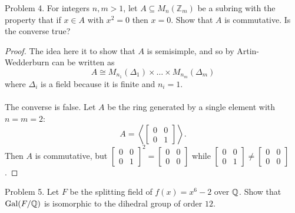 \documentclass{article}
\begin{document}
\begin{subsection}{Problem 4.}
  For integers $n ,m > 1$, let $A \subseteq M_n(\mathbb Z_m)$ be a subring with the property that if $x \in A$ with $x^2 = 0$ then $x = 0$. Show that $A$ is commutative. Is the converse true?
\end{subsection}

\begin{proof}
  The idea here it to show that $A$ is semisimple, and so by Artin-Wedderburn
  can be written as \[
    A \cong M_{n_1}(\Delta_1) \times \hdots \times M_{n_m}(\Delta_m)
  \] where $\Delta_i$ is a field because it is finite and $n_i = 1$.
  \\~\\
  The converse is false. Let $A$ be the ring generated by a single element with $n = m = 2$: \[
    A = \left\langle\begin{bmatrix}0 & 0\\0 & 1\end{bmatrix}\right\rangle.
  \]  Then $A$ is commutative, but
  $\begin{bmatrix}0 & 0\\0 & 1\end{bmatrix}^2 = \begin{bmatrix}0 & 0\\0 & 0\end{bmatrix}$ while $\begin{bmatrix}0 & 0\\0 & 1\end{bmatrix} \neq \begin{bmatrix}0 & 0\\0 & 0\end{bmatrix}$.
\end{proof}
\pagebreak

\begin{subsection}{Problem 5.}
  Let $F$ be the splitting field of $f(x) = x^6 - 2$ over $\mathbb Q$.
  Show that $\operatorname{Gal}(F/\mathbb Q)$ is isomorphic to the dihedral group of order $12$.
\end{subsection}
\end{document}
